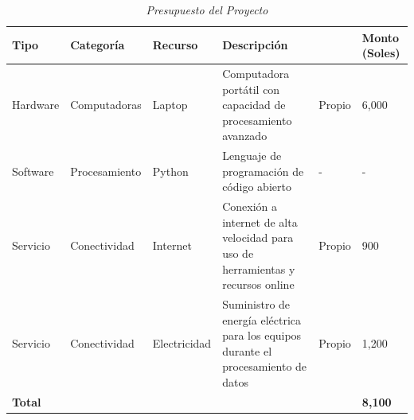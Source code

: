\begin{table}[H]
	\centering
	\caption{\textit{Presupuesto del Proyecto}}
	\begin{adjustbox}{max width=\textwidth}
	\begin{tabular}{p{2cm}p{3cm}p{3cm}p{4.5cm}p{4cm}p{2cm}}
		\hline
		\textbf{Tipo} & \textbf{Categoría} & \textbf{Recurso} & \textbf{Descripción} & \textbf{\raggedright Fuente Financiadora} & \textbf{Monto (Soles)} \\ \hline
		Hardware & Computadoras & Laptop & Computadora portátil con capacidad de procesamiento avanzado & Propio & 6,000 \\ 
		Software & Procesamiento & Python & Lenguaje de programación de código abierto & - & - \\
		Servicio & Conectividad & Internet & Conexión a internet de alta velocidad para uso de herramientas y recursos online & Propio & 900 \\
		Servicio & Conectividad & Electricidad & Suministro de energía eléctrica para los equipos durante el procesamiento de datos & Propio & 1,200 \\ 
		\textbf{Total} & & & & & \textbf{8,100} \\ 
		\hline
	\end{tabular}
	\end{adjustbox}
	\label{tabla:presupuesto}
\end{table}
